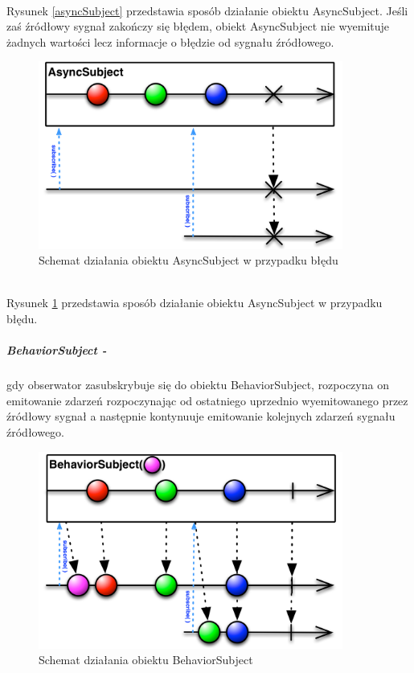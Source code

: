 \documentclass[12pt,oneside,a4paper]{report}
\begin{document}
\\
Rysunek \ref{asyncSubject} przedstawia sposób działanie obiektu AsyncSubject. 
Jeśli zaś źródłowy sygnał zakończy się błędem, obiekt AsyncSubject nie wyemituje żadnych wartości lecz informacje o błędzie od sygnału źródłowego.
\begin{figure}[ht!]
	\centering
	\includegraphics[width=10cm]{asyncSubjectFailed}
	\caption{Schemat działania obiektu AsyncSubject w przypadku błędu\cite{subjects}}
	\label{asyncSubjectFailed}
\end{figure}\\
Rysunek \ref{asyncSubjectFailed} przedstawia sposób działanie obiektu AsyncSubject w przypadku błędu. 
\subparagraph{BehaviorSubject -}gdy obserwator zasubskrybuje się do obiektu BehaviorSubject, rozpoczyna on emitowanie zdarzeń rozpoczynając od ostatniego uprzednio wyemitowanego przez źródłowy sygnał a następnie kontynuuje emitowanie kolejnych zdarzeń sygnału źródłowego.
\begin{figure}[ht!]
	\centering
	\includegraphics[width=10cm]{behaviorSubject}
	\caption{Schemat działania obiektu BehaviorSubject\cite{subjects}}
	\label{behaviorSubject}
\end{figure}
\\
\\
\\
\end{document}
